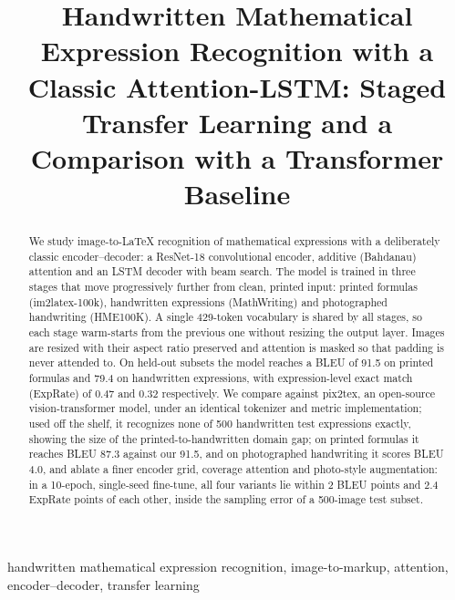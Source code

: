 \documentclass[conference]{IEEEtran}
\begin{document}
\title{Handwritten Mathematical Expression Recognition with a Classic Attention-LSTM: Staged Transfer Learning and a Comparison with a Transformer Baseline}

\author{
\and
{}
\and
{}
}

\maketitle
\IEEEpubidadjcol

\begin{abstract}
We study image-to-\LaTeX{} recognition of mathematical expressions with a deliberately classic encoder--decoder: a ResNet-18 convolutional encoder, additive (Bahdanau) attention and an LSTM decoder with beam search. The model is trained in three stages that move progressively further from clean, printed input: printed formulas (im2latex-100k), handwritten expressions (MathWriting) and photographed handwriting (HME100K). A single 429-token vocabulary is shared by all stages, so each stage warm-starts from the previous one without resizing the output layer. Images are resized with their aspect ratio preserved and attention is masked so that padding is never attended to. On held-out subsets the model reaches a BLEU of 91.5 on printed formulas and 79.4 on handwritten expressions, with expression-level exact match (ExpRate) of 0.47 and 0.32 respectively. We compare against pix2tex, an open-source vision-transformer model, under an identical tokenizer and metric implementation; used off the shelf, it recognizes none of 500 handwritten test expressions exactly, showing the size of the printed-to-handwritten domain gap; on printed formulas it reaches BLEU 87.3 against our 91.5, and on photographed handwriting it scores BLEU 4.0, and ablate a finer encoder grid, coverage attention and photo-style augmentation: in a 10-epoch, single-seed fine-tune, all four variants lie within 2 BLEU points and 2.4 ExpRate points of each other, inside the sampling error of a 500-image test subset.
\end{abstract}

\begin{IEEEkeywords}
handwritten mathematical expression recognition, image-to-markup, attention, encoder--decoder, transfer learning
\end{IEEEkeywords}
\end{document}
